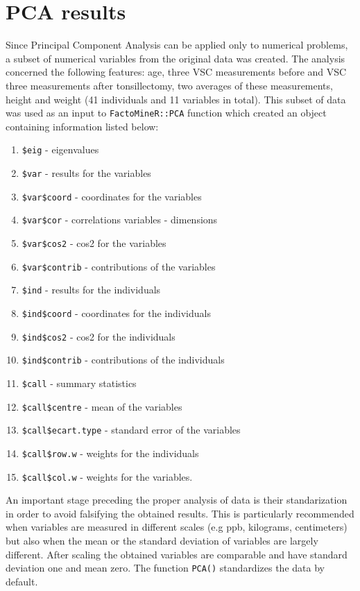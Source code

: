\documentclass[12pt,a4paper,notitlepage]{report}
\begin{document}
\newpage
\section{PCA results}

Since Principal Component Analysis can be applied only to numerical problems, a subset of numerical variables from the original data was created. The analysis concerned the following features: age, three VSC measurements before and VSC three measurements after tonsillectomy, two averages of these measurements, height and weight (41 individuals and 11 variables in total). This subset of data was used as an input to \texttt{FactoMineR::PCA} function which created an object containing information listed below: 

\begin{enumerate}
\item \texttt{\$eig} - eigenvalues
\item \texttt{\$var} - results for the variables
\item \texttt{\$var\$coord} - coordinates for the variables
\item \texttt{\$var\$cor} - correlations variables - dimensions
\item \texttt{\$var\$cos2} - cos2 for the variables
\item \texttt{\$var\$contrib} - contributions of the variables
\item \texttt{\$ind} - results for the individuals
\item \texttt{\$ind\$coord} - coordinates for the individuals
\item \texttt{\$ind\$cos2} - cos2 for the individuals
\item \texttt{\$ind\$contrib} - contributions of the individuals
\item \texttt{\$call} - summary statistics
\item \texttt{\$call\$centre} - mean of the variables
\item \texttt{\$call\$ecart.type} - standard error of the variables
\item \texttt{\$call\$row.w} - weights for the individuals
\item \texttt{\$call\$col.w} - weights for the variables.
\end{enumerate}

An important stage preceding the proper analysis of data is their standarization in order to avoid falsifying the obtained results. This is particularly recommended when variables are measured in different scales (e.g ppb, kilograms, centimeters) but also when the mean or the standard deviation of variables are largely different. After scaling the obtained variables are comparable and have standard deviation one and mean zero. The function \texttt{PCA()} standardizes the data by default.
\end{document}
